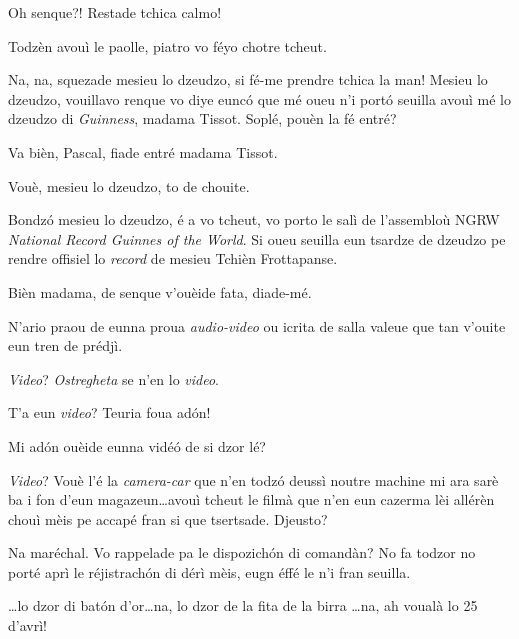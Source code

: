 \begin{drama}
\Ticspeaks {} Oh senque?! Restade tchica calmo!

\DzeudzoSenliquerspeaks {} Todzèn avouì le paolle, piatro vo féyo chotre tcheut.

\Cienspeaks Na, na, squezade mesieu lo dzeudzo, si fé-me pren\-dre tchica la man! Mesieu lo dzeudzo, vouillavo renque vo diye eunc\'o que mé oueu n’i portó seuilla avouì mé lo dzeudzo di \textit{Guinness}, madama Tissot. Soplé, pouèn la fé entré?

\DzeudzoSenliquerspeaks Va bièn, Pascal, fiade entré madama Tissot.

\Pascalspeaks Vouè, mesieu lo dzeudzo, to de chouite.


\Tissotspeaks Bondzó mesieu lo dzeudzo, é a vo tcheut, vo porto le salì de l'assembloù NGRW \textit{National Record Guinnes of the World}. Si oueu seuilla eun tsardze de dzeudzo pe rendre offisiel lo \textit{record} de mesieu Tchièn Frottapanse.

\DzeudzoSenliquerspeaks {} Bièn madama, de senque v'ouèide fata, diade-mé.

\Tissotspeaks N’ario praou de eunna proua \textit{audio-video} ou icrita de salla valeue que tan v'ouite eun tren de prédjì.

\Tacspeaks \textit{Video}? \textit{Ostregheta} se n’en lo \textit{video}.

\Cienspeaks T'a eun \textit{video}? Teuria foua adón!

\DzeudzoSenliquerspeaks {} Mi adón ouèide eunna vidé\'o de si dzor lé?

\Ticspeaks {} \textit{Video}? Vouè l’é la \textit{camera-car} que n’en todzó deussì noutre machine mi ara sarè ba i fon d'eun magazeun\ldots avouì tcheut le filmà que n’en eun cazerma lèi allérèn chouì mèis pe accapé fran si que tsertsade.  Djeusto?

\Tacspeaks Na maréchal. Vo rappelade pa le dispozichón di comandàn? No fa todzor no porté aprì le réjistrachón di dérì mèis, eugn éffé le n’i fran seuilla. 


\Tacspeaks \ldots lo dzor di bat\'on d'or\ldots na, lo dzor de la fita de la birra \ldots na, ah voualà lo 25 d'avrì!


\end{drama}
